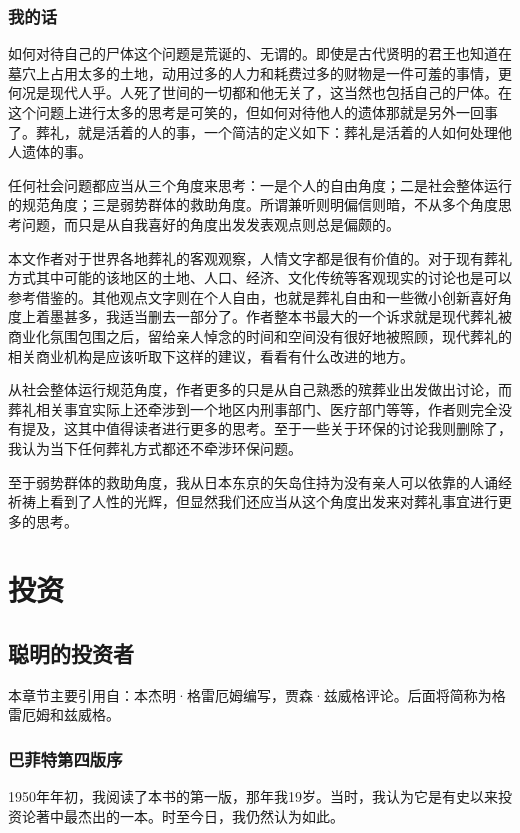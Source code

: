 \documentclass[12pt,oneside]{book}
\begin{document}
\section{我的话}
如何对待自己的尸体这个问题是荒诞的、无谓的。即使是古代贤明的君王也知道在墓穴上占用太多的土地，动用过多的人力和耗费过多的财物是一件可羞的事情，更何况是现代人乎。人死了世间的一切都和他无关了，这当然也包括自己的尸体。在这个问题上进行太多的思考是可笑的，但如何对待他人的遗体那就是另外一回事了。葬礼，就是活着的人的事，一个简洁的定义如下：葬礼是活着的人如何处理他人遗体的事。

任何社会问题都应当从三个角度来思考：一是个人的自由角度；二是社会整体运行的规范角度；三是弱势群体的救助角度。所谓兼听则明偏信则暗，不从多个角度思考问题，而只是从自我喜好的角度出发发表观点则总是偏颇的。

本文作者对于世界各地葬礼的客观观察，人情文字都是很有价值的。对于现有葬礼方式其中可能的该地区的土地、人口、经济、文化传统等客观现实的讨论也是可以参考借鉴的。其他观点文字则在个人自由，也就是葬礼自由和一些微小创新喜好角度上着墨甚多，我适当删去一部分了。作者整本书最大的一个诉求就是现代葬礼被商业化氛围包围之后，留给亲人悼念的时间和空间没有很好地被照顾，现代葬礼的相关商业机构是应该听取下这样的建议，看看有什么改进的地方。

从社会整体运行规范角度，作者更多的只是从自己熟悉的殡葬业出发做出讨论，而葬礼相关事宜实际上还牵涉到一个地区内刑事部门、医疗部门等等，作者则完全没有提及，这其中值得读者进行更多的思考。至于一些关于环保的讨论我则删除了，我认为当下任何葬礼方式都还不牵涉环保问题。

至于弱势群体的救助角度，我从日本东京的矢岛住持为没有亲人可以依靠的人诵经祈祷上看到了人性的光辉，但显然我们还应当从这个角度出发来对葬礼事宜进行更多的思考。


\part{投资}

\chapter{聪明的投资者}
本章节主要引用自\cite{聪明的投资者}：本杰明·格雷厄姆编写，贾森·兹威格评论。后面将简称为格雷厄姆和兹威格。

\section{巴菲特第四版序}
1950年年初，我阅读了本书的第一版，那年我19岁。当时，我认为它是有史以来投资论著中最杰出的一本。时至今日，我仍然认为如此。
\end{document}
